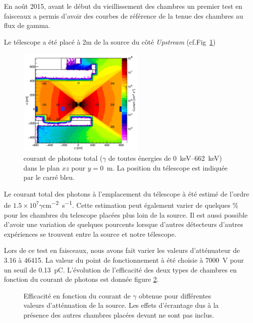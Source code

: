 En août 2015, avant le début du vieillissement des chambres un premier test en faisceaux a permis d'avoir des courbes de référence de la tenue des chambres au flux de gamma.

Le télescope a été placé à 2m de la source du côté \textit{Upstream} (cf.Fig~\ref{PositionChambre})

\begin{figure}[!ht]
	\centering
	\includegraphics[width=0.55\textwidth]{GLA/PositionChamber.png}
	\caption{courant de photons total ($\gamma$ de toutes énergies de \SIrange{0}{662}{\kilo\eV}) dans le plan $xz$ pour $y=$\SI{0}{\meter}. La position du télescope est indiquée par le carré bleu.}
	\label{PositionChambre}
\end{figure}

Le courant total des photons à l'emplacement du télescope à été estimé de l'ordre de $1.5\times10^{7}\gamma$\si{cm^{-2}.s^{-1}}. Cette estimation peut également varier de quelques \% pour les chambres du telescope placées plus loin de la source. Il est aussi possible d'avoir une variation de quelques pourcents lorsque d'autres détecteurs d'autres expériences se trouvent entre la source et notre télescope.

Lors de ce test en faisceaux, nous avons fait varier les valeurs d'atténuateur de \num{3.16} à \num{46415}. La valeur du point de fonctionnement à été choisie à \SI{7000}{\volt} pour un seuil de \SI{0.13}{\pico\coulomb}. L'évolution de l'efficacité des deux types de chambres en fonction du courant de photons est donnée figure \ref{ATTENUATEURGIF}.

\begin{figure}[!ht]
	\centering
	\caption{Efficacité en fonction du courant de $\gamma$ obtenue pour différentes valeurs d'atténuation de la source. Les effets d'écrantage dus à la présence des autres chambres placées devant ne sont pas inclus.}
	\label{ATTENUATEURGIF}
\end{figure}

